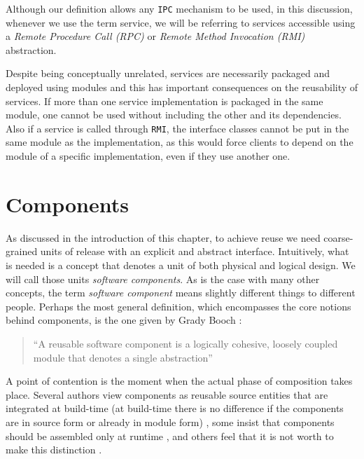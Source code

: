 Although our definition allows any \texttt{IPC} mechanism to be used, in this discussion, whenever we use the term service, we will be referring to
services accessible using a \emph{Remote Procedure Call (RPC)} or \emph{Remote Method Invocation (RMI)} abstraction.

Despite being conceptually unrelated, services are necessarily packaged and deployed using modules and this has important consequences on the
reusability of services. If more than one service implementation is packaged in the same module, one cannot be used without including the other
and its dependencies. Also if a service is called through \texttt{RMI}, the interface classes cannot be put in the same module as the implementation,
as this would force clients to depend on the module of a specific implementation, even if they use another one.


\section{Components}
\label{sec:components}

As discussed in the introduction of this chapter, to achieve reuse we need coarse-grained units of release with an
explicit and abstract interface. Intuitively, what is needed is a concept that denotes a unit of both physical and
logical design. We will call those units \emph{software components}. As is the case with many other concepts,
the term \emph{software component} means slightly different things to different people. Perhaps the most general
definition, which encompasses the core notions behind components, is the one given by Grady Booch \cite{Booch87}:

\begin{quotation}
``A reusable software component is a logically cohesive, loosely coupled module that denotes a single abstraction''
\end{quotation}

A point of contention is the moment when the actual phase of composition takes place. Several authors view components as reusable source entities that
are integrated at build-time (at build-time there is no difference if the components are in source form or already in module form) \cite{Lakos}, some
insist that components should be assembled only at runtime \cite{Szyperski} \cite{Heineman}, and others feel that it is not worth to make this distinction
\cite{Czarnecki00} \cite{Sametinger}.

